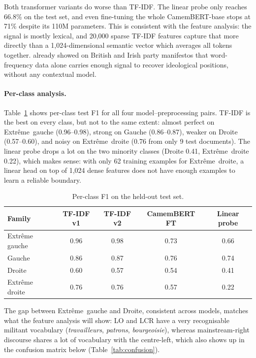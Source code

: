 \documentclass{article}
\begin{document}
Both transformer variants do worse than TF-IDF. The linear probe only reaches 66.8\% on the test set, and even fine-tuning the whole CamemBERT-base stops at 71\% despite its 110M parameters. This is consistent with the feature analysis: the signal is mostly lexical, and 20{,}000 sparse TF-IDF features capture that more directly than a 1{,}024-dimensional semantic vector which averages all tokens together. \citet{laver2003extracting} already showed on British and Irish party manifestos that word-frequency data alone carries enough signal to recover ideological positions, without any contextual model.

\paragraph{Per-class analysis.}
Table~\ref{tab:per_class} shows per-class test F1 for all four model--preprocessing pairs. TF-IDF is the best on every class, but not to the same extent: almost perfect on Extr\^{e}me~gauche (0.96--0.98), strong on Gauche (0.86--0.87), weaker on Droite (0.57--0.60), and noisy on Extr\^{e}me~droite (0.76 from only 9 test documents). The linear probe drops a lot on the two minority classes (Droite 0.41, Extr\^{e}me~droite 0.22), which makes sense: with only 62 training examples for Extr\^{e}me~droite, a linear head on top of 1{,}024 dense features does not have enough examples to learn a reliable boundary.

\begin{table}[h]
  \caption{Per-class F1 on the held-out test set.}
  \label{tab:per_class}
  \centering
  \begin{tabular}{lcccc}
    \toprule
    Family & TF-IDF v1 & TF-IDF v2 & CamemBERT FT & Linear probe \\
    \midrule
    Extr\^{e}me gauche & 0.96 & 0.98 & 0.73 & 0.66 \\
    Gauche              & 0.86 & 0.87 & 0.76 & 0.74 \\
    Droite              & 0.60 & 0.57 & 0.54 & 0.41 \\
    Extr\^{e}me droite  & 0.76 & 0.76 & 0.57 & 0.22 \\
    \bottomrule
  \end{tabular}
\end{table}

The gap between Extr\^{e}me~gauche and Droite, consistent across models, matches what the feature analysis will show: LO and LCR have a very recognisable militant vocabulary (\textit{travailleurs}, \textit{patrons}, \textit{bourgeoisie}), whereas mainstream-right discourse shares a lot of vocabulary with the centre-left, which also shows up in the confusion matrix below (Table~\ref{tab:confusion}).
\end{document}
